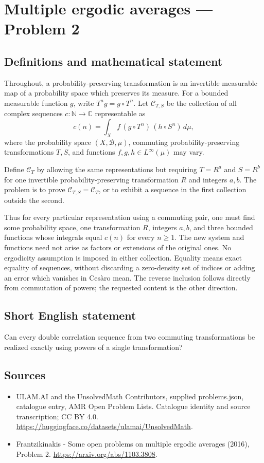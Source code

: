 \documentclass[11pt,a4paper]{article}
\begin{document}
\section*{Multiple ergodic averages — Problem 2}\label{statement}

\subsection{Definitions and mathematical statement}
Throughout, a probability-preserving transformation is an invertible
measurable map of a probability space which preserves its measure.
For a bounded measurable function $g$, write $T^ng=g\circ T^n$.
Let $\mathcal C_{T,S}$ be the collection of all complex sequences
$c:\mathbb N\to\mathbb C$ representable as
\[
             c(n)=\int_X f\,(g\circ T^n)\,(h\circ S^n)\,d\mu,
\]
where the probability space $(X,\mathcal B,\mu)$, commuting
probability-preserving transformations $T,S$, and functions
$f,g,h\in L^\infty(\mu)$ may vary.

Define $\mathcal C_T$ by allowing the same representations but
requiring $T=R^a$ and $S=R^b$ for one invertible probability-preserving
transformation $R$ and integers $a,b$. The problem is to prove
$\mathcal C_{T,S}=\mathcal C_T$, or to exhibit a sequence in the
first collection outside the second.

Thus for every particular representation using a commuting pair,
one must find some probability space, one transformation $R$,
integers $a,b$, and three bounded functions whose integrals equal
$c(n)$ for every $n\ge1$. The new system and functions need
not arise as factors or extensions of the original ones.
No ergodicity assumption is imposed in either collection.
Equality means exact equality of sequences, without discarding
a zero-density set of indices or adding an error which vanishes
in Ces\`aro mean. The reverse inclusion follows directly from
commutation of powers; the requested content is the other direction.
\subsection{Short English statement}
Can every double correlation sequence from two commuting transformations be realized exactly using powers of a single transformation?
\subsection{Sources}
\begin{itemize}
\item[S1] ULAM.AI and the UnsolvedMath Contributors, supplied problems.json, catalogue entry, AMR Open Problem Lists. Catalogue identity and source transcription; CC BY 4.0.
\url{https://huggingface.co/datasets/ulamai/UnsolvedMath}.
\item[S2] Frantzikinakis - Some open problems on multiple ergodic averages (2016), Problem 2. 
\url{https://arxiv.org/abs/1103.3808}.
\end{itemize}
\end{document}
